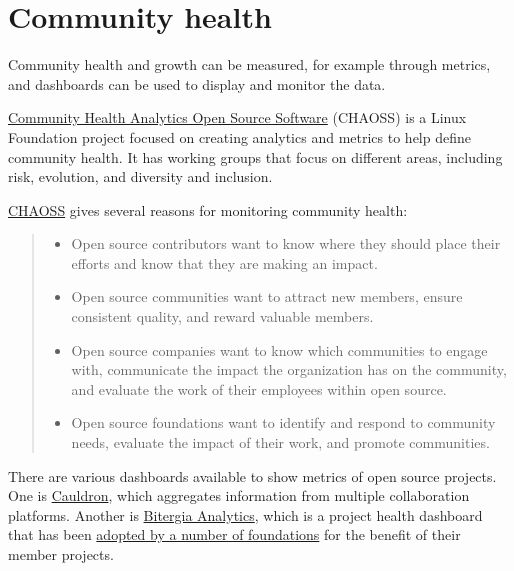 


\chapter{Community health}

Community health and growth can be measured, for example through metrics, and dashboards can be used to display and monitor the data.

\href{https://chaoss.community/}{Community Health Analytics Open Source Software} (CHAOSS) is a Linux Foundation project focused on creating analytics and metrics to help define community health.  It has working groups that focus on different areas, including risk, evolution, and diversity and inclusion.

\begin{kaobox}[frametitle=CHAOSS: the importance of community health]

\href{https://chaoss.community/about/}{CHAOSS} gives several reasons for monitoring community health:

\begin{quote}

\begin{itemize}

\itemsep 0.5em

\item Open source contributors want to know where they should place their efforts and know that they are making an impact.
\item Open source communities want to attract new members, ensure consistent quality, and reward valuable members.
\item Open source companies want to know which communities to engage with, communicate the impact the organization has on the community, and evaluate the work of their employees within open source.
\item Open source foundations want to identify and respond to community needs, evaluate the impact of their work, and promote communities.

\end{itemize}

\end{quote}

\end{kaobox}

There are various dashboards available to show metrics of open source projects.  One is \href{https://cauldron.io/}{Cauldron}, which aggregates information from multiple collaboration platforms.  Another is \href{https://bitergia.com/bitergia-analytics/}{Bitergia Analytics}, which is a project health dashboard that has been \href{https://bitergia.com/oss-foundations/}{adopted by a number of foundations} for the benefit of their member projects.

